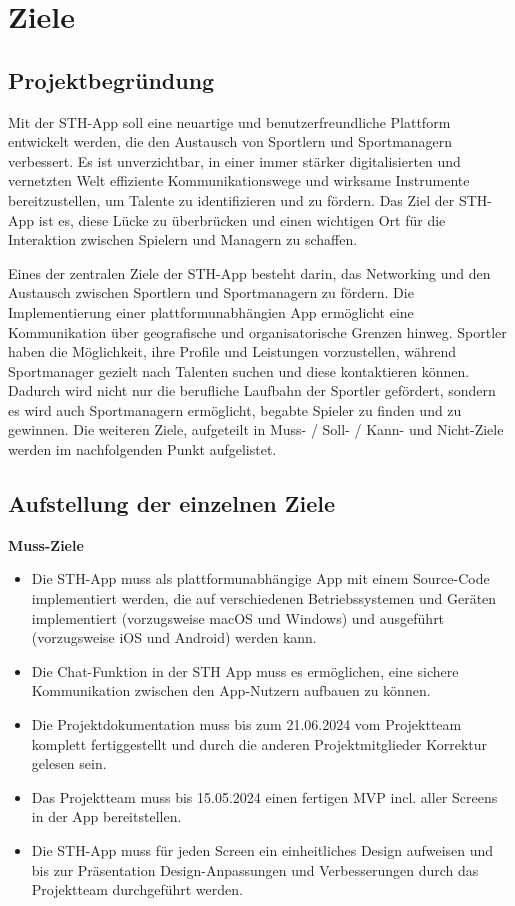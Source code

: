 \chapter{Ziele}
\section{Projektbegründung}
Mit der STH-App soll eine neuartige und benutzerfreundliche Plattform entwickelt werden, die den Austausch von Sportlern und Sportmanagern verbessert.
Es ist unverzichtbar, in einer immer stärker digitalisierten und vernetzten Welt effiziente Kommunikationswege und wirksame Instrumente bereitzustellen, um Talente zu identifizieren und zu fördern.
Das Ziel der STH-App ist es, diese Lücke zu überbrücken und einen wichtigen Ort für die Interaktion zwischen Spielern und Managern zu schaffen.

\noindent
Eines der zentralen Ziele der STH-App besteht darin, das Networking und den Austausch zwischen Sportlern und Sportmanagern zu fördern.
Die Implementierung einer plattformunabhängien App ermöglicht eine Kommunikation über geografische und organisatorische Grenzen hinweg.
Sportler haben die Möglichkeit, ihre Profile und Leistungen vorzustellen, während Sportmanager gezielt nach Talenten suchen und diese kontaktieren können.
Dadurch wird nicht nur die berufliche Laufbahn der Sportler gefördert, sondern es wird auch Sportmanagern ermöglicht, begabte Spieler zu finden und zu gewinnen.
\newline
Die weiteren Ziele, aufgeteilt in Muss- / Soll- / Kann- und Nicht-Ziele werden im nachfolgenden Punkt aufgelistet.

\section{Aufstellung der einzelnen Ziele}
\textbf{Muss-Ziele}
\begin{itemize}
    \item Die STH-App muss als plattformunabhängige App mit einem Source-Code implementiert werden, die auf verschiedenen Betriebssystemen und Geräten implementiert (vorzugsweise macOS und Windows) und ausgeführt (vorzugsweise iOS und Android) werden kann.
    \item Die Chat-Funktion in der STH App muss es ermöglichen, eine sichere Kommunikation zwischen den App-Nutzern aufbauen zu können.
    \item Die Projektdokumentation muss bis zum 21.06.2024 vom Projektteam komplett fertiggestellt und durch die anderen Projektmitglieder Korrektur gelesen sein.
    \item Das Projektteam muss bis 15.05.2024 einen fertigen MVP incl. aller Screens in der App bereitstellen.
    \item Die STH-App muss für jeden Screen ein einheitliches Design aufweisen und bis zur Präsentation Design-Anpassungen und Verbesserungen durch das Projektteam durchgeführt werden.
\end{itemize}

